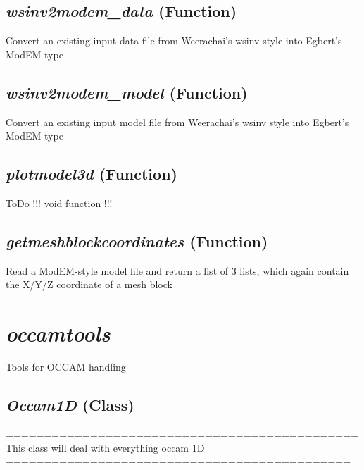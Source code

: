 \subsection{\textit{wsinv2modem\_data} (Function)}
\label{ssec:.modeling.modemtools.wsinv2modem_data}

    Convert an existing input data file from Weerachai's wsinv style into Egbert's ModEM type


\subsection{\textit{wsinv2modem\_model} (Function)}
\label{ssec:.modeling.modemtools.wsinv2modem_model}

    Convert an existing input model file from Weerachai's wsinv style into Egbert's ModEM type


\subsection{\textit{plotmodel3d} (Function)}
\label{ssec:.modeling.modemtools.plotmodel3d}

ToDo !!! void function !!! 

\subsection{\textit{getmeshblockcoordinates} (Function)}
\label{ssec:.modeling.modemtools.getmeshblockcoordinates}

Read a ModEM-style model file and return a list of 3 lists, which again contain the X/Y/Z coordinate of a mesh block




\section{\textit{occamtools} }
\label{sec:modeling.occamtools}

Tools for OCCAM handling


\subsection{\textit{Occam1D} (Class)}
\label{ssec:.modeling.occamtools.Occam1D}

    ==============================================\\
    This class will deal with everything occam 1D\\
    =============================================\\

